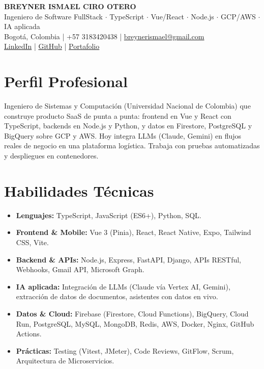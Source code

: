 \documentclass[11pt,a4paper]{article}
\begin{document}
\begin{center}
    {\huge \textbf{BREYNER ISMAEL CIRO OTERO}} \\ \vspace{0.15cm}
    {\large Ingeniero de Software FullStack $\cdot$ TypeScript $\cdot$ Vue/React $\cdot$ Node.js $\cdot$ GCP/AWS $\cdot$ IA aplicada} \\ \vspace{0.15cm}
    Bogotá, Colombia | +57 3183420438 | \href{mailto:breynerismael@gmail.com}{breynerismael@gmail.com} \\ \vspace{0.1cm}
    \href{https://www.linkedin.com/in/breyner-ciro-38011330b/}{LinkedIn} | \href{https://github.com/breynerciro}{GitHub} | \href{https://breynerciro.github.io}{Portafolio}
\end{center}

\vspace{0.2cm}

\section*{Perfil Profesional}
Ingeniero de Sistemas y Computación (Universidad Nacional de Colombia) que construye producto SaaS de punta a punta: frontend en Vue y React con TypeScript, backends en Node.js y Python, y datos en Firestore, PostgreSQL y BigQuery sobre GCP y AWS. Hoy integra LLMs (Claude, Gemini) en flujos reales de negocio en una plataforma logística. Trabaja con pruebas automatizadas y despliegues en contenedores.

\section*{Habilidades Técnicas}
\begin{itemize}[leftmargin=*, noitemsep]
    \item \textbf{Lenguajes:} TypeScript, JavaScript (ES6+), Python, SQL.
    \item \textbf{Frontend \& Mobile:} Vue 3 (Pinia), React, React Native, Expo, Tailwind CSS, Vite.
    \item \textbf{Backend \& APIs:} Node.js, Express, FastAPI, Django, APIs RESTful, Webhooks, Gmail API, Microsoft Graph.
    \item \textbf{IA aplicada:} Integración de LLMs (Claude vía Vertex AI, Gemini), extracción de datos de documentos, asistentes con datos en vivo.
    \item \textbf{Datos \& Cloud:} Firebase (Firestore, Cloud Functions), BigQuery, Cloud Run, PostgreSQL, MySQL, MongoDB, Redis, AWS, Docker, Nginx, GitHub Actions.
    \item \textbf{Prácticas:} Testing (Vitest, JMeter), Code Reviews, GitFlow, Scrum, Arquitectura de Microservicios.
\end{itemize}
\end{document}
